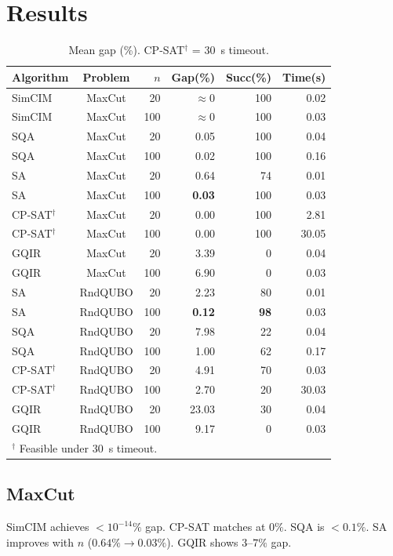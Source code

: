 \documentclass[10pt,twocolumn]{article}
\begin{document}
\section{Results}
\begin{table}[t]\centering\small
\caption{Mean gap (\%). CP-SAT$^\dagger$ = 30~s timeout.}
\label{tab:main}
\begin{tabular}{lcrrrr}
\toprule
Algorithm & Problem & $n$ & Gap(\%) & Succ(\%) & Time(s)\\
\midrule
SimCIM & MaxCut & 20 & $\approx$0 & 100 & 0.02\\
SimCIM & MaxCut & 100 & $\approx$0 & 100 & 0.03\\
SQA & MaxCut & 20 & 0.05 & 100 & 0.04\\
SQA & MaxCut & 100 & 0.02 & 100 & 0.16\\
SA & MaxCut & 20 & 0.64 & 74 & 0.01\\
SA & MaxCut & 100 & \textbf{0.03} & 100 & 0.03\\
CP-SAT$^\dagger$ & MaxCut & 20 & 0.00 & 100 & 2.81\\
CP-SAT$^\dagger$ & MaxCut & 100 & 0.00 & 100 & 30.05\\
GQIR & MaxCut & 20 & 3.39 & 0 & 0.04\\
GQIR & MaxCut & 100 & 6.90 & 0 & 0.03\\
\addlinespace
SA & RndQUBO & 20 & 2.23 & 80 & 0.01\\
SA & RndQUBO & 100 & \textbf{0.12} & \textbf{98} & 0.03\\
SQA & RndQUBO & 20 & 7.98 & 22 & 0.04\\
SQA & RndQUBO & 100 & 1.00 & 62 & 0.17\\
CP-SAT$^\dagger$ & RndQUBO & 20 & 4.91 & 70 & 0.03\\
CP-SAT$^\dagger$ & RndQUBO & 100 & 2.70 & 20 & 30.03\\
GQIR & RndQUBO & 20 & 23.03 & 30 & 0.04\\
GQIR & RndQUBO & 100 & 9.17 & 0 & 0.03\\
\bottomrule
\multicolumn{5}{l}{\footnotesize $^\dagger$ Feasible under 30~s timeout.}
\end{tabular}
\end{table}

\subsection*{MaxCut}
SimCIM achieves $<10^{-14}\%$ gap. CP-SAT matches at $0\%$. SQA is $<0.1\%$. SA improves with $n$ ($0.64\%\to0.03\%$). GQIR shows $3$--$7\%$ gap.
\end{document}
